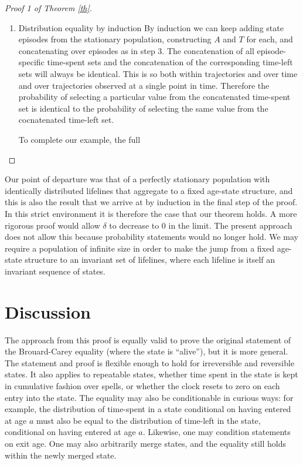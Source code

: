 \documentclass[12pt,oneside,a4paper]{article}
\theoremstyle{definition}
\begin{document}
\begin{proof}[Proof 1 of Theorem \ref{th}]
\begin{enumerate}
\item{Distribution equality by induction} By induction we can keep adding state episodes from the stationary population, constructing $A$ and $T$ for each, and concatenating over episodes as in step 3. The concatenation of all episode-specific time-spent sets and the concatenation 
of the corresponding time-left sets will always be identical. This is so both within trajectories and over time and over trajectories observed at a single point in time. Therefore the probability of selecting a particular value from the concatenated time-spent set is identical
to the probability of selecting the same value from the cocnatenated time-left set.

To complete our example, the full


\end{enumerate}
\end{proof}

Our point of departure was that of a perfectly stationary population with
identically distributed lifelines that aggregate to a fixed age-state structure,
and this is also the result that we arrive at by induction in the final step of
the proof. In this strict environment it is therefore the case that our theorem
holds. A more rigorous proof would allow $\delta$ to decrease to 0 in the
limit. The present approach does not allow this because probability statements
would no longer hold. We may require a population of infinite size in order to
make the jump from a fixed age-state structure to an invariant set of lifelines,
where each lifeline is itself an invariant sequence of states. 

\section{Discussion}
The approach from this proof is equally valid to prove the
original statement of the Brouard-Carey equality (where the state is ``alive''),
but it is more general.
The statement and proof is flexible enough to hold for irreversible and reversible
states. It also applies to repeatable states, whether time spent in the
state is kept in cumulative fashion over spells, or whether the clock resets to
zero on each entry into the state. The equality may also be conditionable in
curious ways: for example, the distribution of time-spent in a state conditional
on having entered at age $a$ must also be equal to the distribution of time-left in
the state, conditional on having entered at age $a$. Likewise, one may condition
statements on exit age. One may also arbitrarily merge states, and the equality
still holds within the newly merged state.
\end{document}
